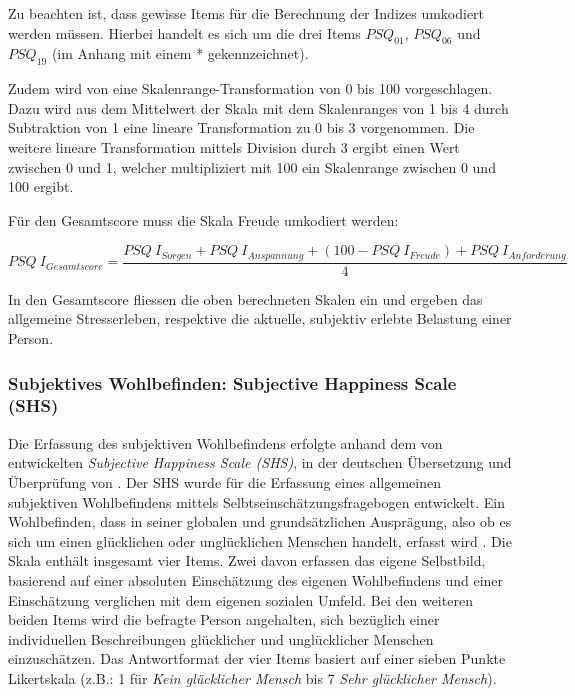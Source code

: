 Zu beachten ist, dass gewisse Items für die Berechnung der Indizes umkodiert werden müssen. Hierbei handelt es sich um die drei Items $PSQ_{01}$, $PSQ_{06}$ und $PSQ_{19}$ (im Anhang  mit einem * gekennzeichnet).

Zudem wird von  eine Skalenrange-Transformation von 0 bis 100 vorgeschlagen. Dazu wird aus dem Mittelwert der Skala mit dem Skalenranges von 1 bis 4 durch Subtraktion von 1 eine lineare Transformation zu 0 bis 3 vorgenommen. Die weitere lineare Transformation mittels Division durch 3 ergibt einen Wert zwischen 0 und 1, welcher multipliziert mit 100 ein Skalenrange zwischen 0 und 100 ergibt.  

Für den Gesamtscore muss die Skala Freude umkodiert werden:

\begin{equation}\label{eq:PSQGesamtscore}
    PSQ~I_{Gesamtscore}=\frac{PSQ~I_{Sorgen}+PSQ~I_{Anspannung}+ (100-PSQ~I_{Freude})+PSQ~I_{Anforderung}}{4}
\end{equation}

In den Gesamtscore fliessen die oben berechneten Skalen ein und ergeben das allgemeine Stresserleben, respektive die aktuelle, subjektiv erlebte Belastung einer Person.

\subsubsection{Subjektives Wohlbefinden: Subjective Happiness Scale (SHS)}\label{sec:SWB}
Die Erfassung des subjektiven Wohlbefindens erfolgte anhand dem von  entwickelten \textit{Subjective Happiness Scale (SHS)}, in der deutschen Übersetzung und Überprüfung von . Der SHS wurde für die Erfassung  eines allgemeinen subjektiven Wohlbefindens mittels Selbtseinschätzungsfragebogen entwickelt. Ein Wohlbefinden, dass in seiner globalen und grundsätzlichen Ausprägung, also ob es sich um einen glücklichen oder unglücklichen Menschen handelt, erfasst wird  \cite[S.~139ff]{Lyubomirsky1999}. Die Skala enthält insgesamt vier Items. Zwei davon erfassen das eigene Selbstbild, basierend auf einer absoluten Einschätzung des eigenen Wohlbefindens und einer Einschätzung verglichen mit dem eigenen sozialen Umfeld. Bei den weiteren beiden Items wird die befragte Person angehalten, sich bezüglich einer individuellen Beschreibungen glücklicher und unglücklicher Menschen einzuschätzen. Das Antwortformat der vier Items basiert auf einer sieben Punkte Likertskala (z.B.: 1 für \textit{Kein glücklicher Mensch} bis 7 \textit{Sehr glücklicher Mensch}). 

